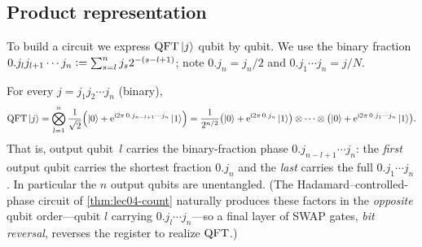 \subsection*{Product representation}

To build a circuit we express $\mathrm{QFT}\ket{j}$ qubit by qubit. We use the binary
fraction $0.j_l j_{l+1}\cdots j_n\vcentcolon=\sum_{s=l}^{n} j_s 2^{-(s-l+1)}$; note
$0.j_n=j_n/2$ and $0.j_1\cdots j_n=j/N$.

\begin{theorem}
\label{thm:lec04-product}
For every $j=j_1 j_2\cdots j_n$ (binary),
\[
  \mathrm{QFT}\ket{j}
   =\bigotimes_{l=1}^{n}
     \frac{1}{\sqrt2}\Bigl(\ket{0}+\mathrm{e}^{\mathrm{i} 2\pi\,0.j_{n-l+1}\cdots j_n}\ket{1}\Bigr)
   =\frac{1}{2^{n/2}}
     \bigl(\ket{0}+\mathrm{e}^{\mathrm{i} 2\pi\,0.j_n}\ket{1}\bigr)\otimes\cdots\otimes
     \bigl(\ket{0}+\mathrm{e}^{\mathrm{i} 2\pi\,0.j_1\cdots j_n}\ket{1}\bigr).
\]
That is, output qubit~$l$ carries the binary-fraction phase $0.j_{n-l+1}\cdots j_n$:
the \emph{first} output qubit carries the shortest fraction $0.j_n$ and the
\emph{last} carries the full $0.j_1\cdots j_n$. In particular the $n$ output qubits
are unentangled. (The Hadamard--controlled-phase circuit of \cref{thm:lec04-count}
naturally produces these factors in the \emph{opposite} qubit order---qubit $l$
carrying $0.j_l\cdots j_n$---so a final layer of SWAP gates, \emph{bit reversal},
reverses the register to realize $\mathrm{QFT}$.)
\end{theorem}

